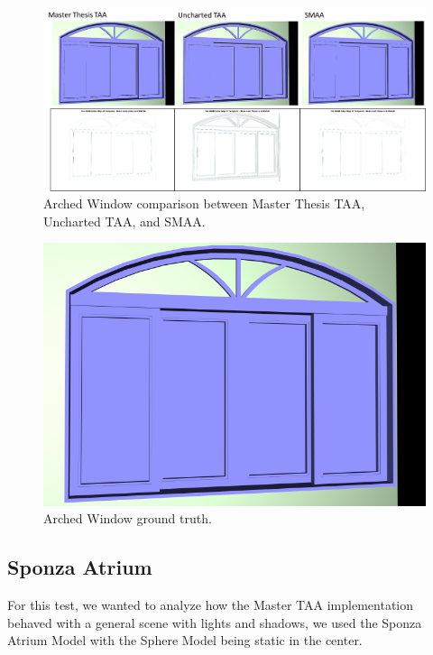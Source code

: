 \documentclass{cslthse-msc}
\begin{document}
\begin{figure}[H]
	\centering
	\includegraphics[scale=0.8]{images/results/window_arch.png}
	\caption{Arched Window comparison between Master Thesis TAA, Uncharted TAA, and SMAA.}\label{fig:window_arch_render}
\end{figure}

\begin{figure}[H]
	\centering
	\includegraphics[scale=0.18]{images/results/window_arch_sobel_ground_truth.png}
	\caption{Arched Window ground truth.}\label{fig:window_arch_truth}
\end{figure}

\subsection{Sponza Atrium}
For this test, we wanted to analyze how the Master TAA implementation behaved with a general scene with lights and shadows, we used the Sponza Atrium Model with the Sphere Model being static in the center.
\end{document}

